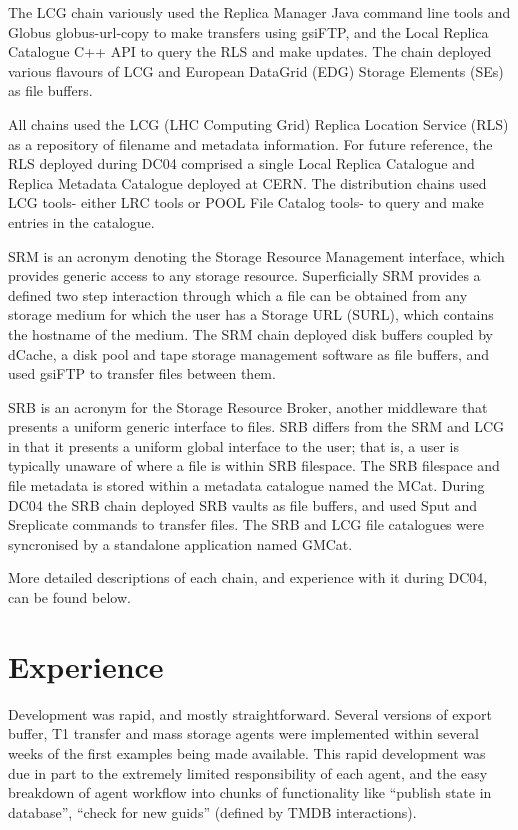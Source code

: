 \documentclass{cmspaper}
\begin{document}
The LCG chain variously used the Replica Manager Java command line tools and Globus globus-url-copy to make transfers using gsiFTP, and the Local Replica Catalogue C++ API to query the RLS and make updates. The chain deployed various flavours of LCG and European DataGrid (EDG) Storage Elements (SEs) as file buffers.

All chains used the LCG (LHC Computing Grid) Replica Location Service (RLS) as a repository of filename and metadata information. For future reference, the RLS deployed during DC04 comprised a single Local Replica Catalogue and Replica Metadata Catalogue deployed at CERN. The distribution chains used LCG tools- either LRC tools or POOL File Catalog tools- to query and make entries in the catalogue.

SRM is an acronym denoting the Storage Resource Management interface, which provides generic access to any storage resource. Superficially SRM provides a defined two step interaction through which a file can be obtained from any storage medium for which the user has a Storage URL (SURL), which contains the hostname of the medium. The SRM chain deployed disk buffers coupled by dCache, a disk pool and tape storage management software as file buffers, and used gsiFTP to transfer files between them.

SRB is an acronym for the Storage Resource Broker, another middleware that presents a uniform generic interface to files. SRB differs from the SRM and LCG in that it presents a uniform global interface to the user; that is, a user is typically unaware of where a file is within SRB filespace. The SRB filespace and file metadata is stored within a metadata catalogue named the MCat. During DC04 the SRB chain deployed SRB vaults as file buffers, and used Sput and Sreplicate commands to transfer files. The SRB and LCG file catalogues were syncronised by a standalone application named GMCat.

More detailed descriptions of each chain, and experience with it during DC04, can be found below.

\section{Experience}
Development was rapid, and mostly straightforward. Several versions of export buffer, T1 transfer and mass storage agents were implemented within several weeks of the first examples being made available. This rapid development was due in part to the extremely limited responsibility of each agent, and the easy breakdown of agent workflow into chunks of functionality like ``publish state in database'', ``check for new guids'' (defined by TMDB interactions).
\end{document}
